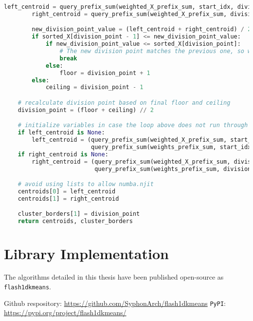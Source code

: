 \begin{lstlisting}[language=Python]
        left_centroid = query_prefix_sum(weighted_X_prefix_sum, start_idx, division_point) / left_weight_sum
        right_centroid = query_prefix_sum(weighted_X_prefix_sum, division_point, stop_idx) / right_weight_sum

        new_division_point_value = (left_centroid + right_centroid) / 2
        if sorted_X[division_point - 1] <= new_division_point_value:
            if new_division_point_value <= sorted_X[division_point]:
                # The new division point matches the previous one, so we can stop
                break
            else:
                floor = division_point + 1
        else:
            ceiling = division_point - 1

    # recalculate division point based on final floor and ceiling
    division_point = (floor + ceiling) // 2

    # initialize variables in case the loop above does not run through
    if left_centroid is None:
        left_centroid = (query_prefix_sum(weighted_X_prefix_sum, start_idx, division_point) /
                         query_prefix_sum(weights_prefix_sum, start_idx, division_point))
    if right_centroid is None:
        right_centroid = (query_prefix_sum(weighted_X_prefix_sum, division_point, stop_idx) /
                          query_prefix_sum(weights_prefix_sum, division_point, stop_idx))

    # avoid using lists to allow numba.njit
    centroids[0] = left_centroid
    centroids[1] = right_centroid

    cluster_borders[1] = division_point
    return centroids, cluster_borders
\end{lstlisting}

\section{Library Implementation}
\label{sec:github}
The algorithms detailed in this thesis have been published open-source as \texttt{flash1dkmeans}.

\noindent Github respository: \url{https://github.com/SyphonArch/flash1dkmeans} \newline
\texttt{PyPI}: \url{https://pypi.org/project/flash1dkmeans/}